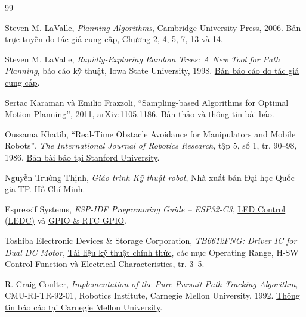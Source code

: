 \documentclass[12pt,a4paper,oneside]{report}
\begin{document}
\begin{thebibliography}{99}

Steven M. LaValle, \textit{Planning Algorithms}, Cambridge University Press, 2006.
\href{https://lavalle.pl/planning/}{Bản trực tuyến do tác giả cung cấp}, Chương 2, 4, 5, 7, 13 và 14.


Steven M. LaValle, \textit{Rapidly-Exploring Random Trees: A New Tool for Path Planning},
báo cáo kỹ thuật, Iowa State University, 1998.
\href{https://lavalle.pl/papers/Lav98c.pdf}{Bản báo cáo do tác giả cung cấp}.

Sertac Karaman và Emilio Frazzoli, ``Sampling-based Algorithms for Optimal Motion Planning'',
2011, arXiv:1105.1186.
\href{https://arxiv.org/abs/1105.1186}{Bản thảo và thông tin bài báo}.

Oussama Khatib, ``Real-Time Obstacle Avoidance for Manipulators and Mobile Robots'',
\textit{The International Journal of Robotics Research}, tập 5, số 1, tr. 90--98, 1986.
\href{https://khatib.stanford.edu/publications/pdfs/Khatib_1986_IJRR.pdf}{Bản bài báo tại Stanford University}.

Nguyễn Trường Thịnh, \textit{Giáo trình Kỹ thuật robot}, Nhà xuất bản Đại học Quốc gia TP. Hồ Chí Minh.

Espressif Systems, \textit{ESP-IDF Programming Guide -- ESP32-C3},
\href{https://docs.espressif.com/projects/esp-idf/en/stable/esp32c3/api-reference/peripherals/ledc.html}{LED Control (LEDC)} và
\href{https://docs.espressif.com/projects/esp-idf/en/stable/esp32c3/api-reference/peripherals/gpio.html}{GPIO \& RTC GPIO}.

Toshiba Electronic Devices \& Storage Corporation, \textit{TB6612FNG: Driver IC for Dual DC Motor},
\href{https://toshiba.semicon-storage.com/info/TB6612FNG_datasheet_en_20141001.pdf?did=10660\&prodName=TB6612FNG}{Tài liệu kỹ thuật chính thức},
các mục Operating Range, H-SW Control Function và Electrical Characteristics, tr. 3--5.

R. Craig Coulter, \textit{Implementation of the Pure Pursuit Path Tracking Algorithm},
CMU-RI-TR-92-01, Robotics Institute, Carnegie Mellon University, 1992.
\href{https://publications.ri.cmu.edu/implementation-of-the-pure-pursuit-path-tracking-algorithm}{Thông tin báo cáo tại Carnegie Mellon University}.

\end{thebibliography}
\end{document}
